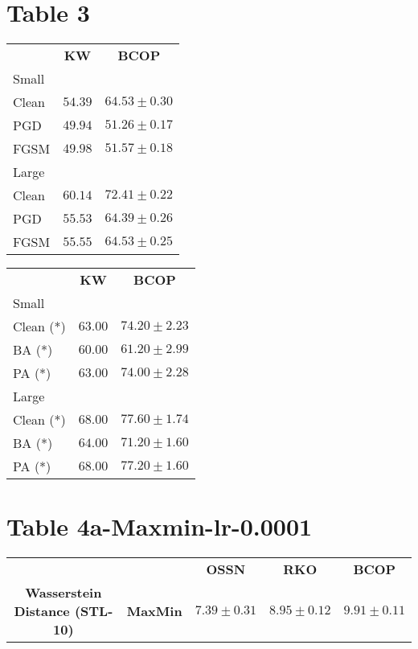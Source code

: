 \documentclass{article}%
\begin{document}
%
\section*{Table 3}%
\label{sec:Table3}%
\begin{minipage}{0.5\textwidth}%
\begin{tabularx}{\textwidth}{lcc}%
\textbf{}&\textbf{KW}&\textbf{BCOP}\\%
\cmidrule{1-3}%
Small&&\\%
\cmidrule{1-3}%
Clean&$54.39$&$\mathbf{64.53}\pm0.30$\\%
PGD&$49.94$&$\mathbf{51.26}\pm0.17$\\%
FGSM&$49.98$&$\mathbf{51.57}\pm0.18$\\%
\cmidrule{1-3}%
Large&&\\%
\cmidrule{1-3}%
Clean&$60.14$&$\mathbf{72.41}\pm0.22$\\%
PGD&$55.53$&$\mathbf{64.39}\pm0.26$\\%
FGSM&$55.55$&$\mathbf{64.53}\pm0.25$\\%
\end{tabularx}%
\end{minipage}%
\begin{minipage}{0.5\textwidth}%
\begin{tabularx}{\textwidth}{lcc}%
\textbf{}&\textbf{KW}&\textbf{BCOP}\\%
\cmidrule{1-3}%
Small&&\\%
\cmidrule{1-3}%
Clean (*)&$63.00$&$\mathbf{74.20}\pm2.23$\\%
BA (*)&$60.00$&$\mathbf{61.20}\pm2.99$\\%
PA (*)&$63.00$&$\mathbf{74.00}\pm2.28$\\%
\cmidrule{1-3}%
Large&&\\%
\cmidrule{1-3}%
Clean (*)&$68.00$&$\mathbf{77.60}\pm1.74$\\%
BA (*)&$64.00$&$\mathbf{71.20}\pm1.60$\\%
PA (*)&$68.00$&$\mathbf{77.20}\pm1.60$\\%
\end{tabularx}%
\end{minipage}

%
\section*{Table 4a{-}Maxmin{-}lr{-}0.0001}%
\label{sec:Table4a{-}Maxmin{-}lr{-}0.0001}%
\begin{tabularx}{\textwidth}{ccccc}%
\textbf{}&\textbf{}&\textbf{OSSN}&\textbf{RKO}&\textbf{BCOP}\\%
\cmidrule{1-5}%
\multirow{1}{*}{\textbf{Wasserstein Distance (STL-10)}}&\textbf{MaxMin}&$7.39\pm0.31$&$8.95\pm0.12$&$\mathbf{9.91}\pm0.11$\\%
\end{tabularx}
\end{document}
